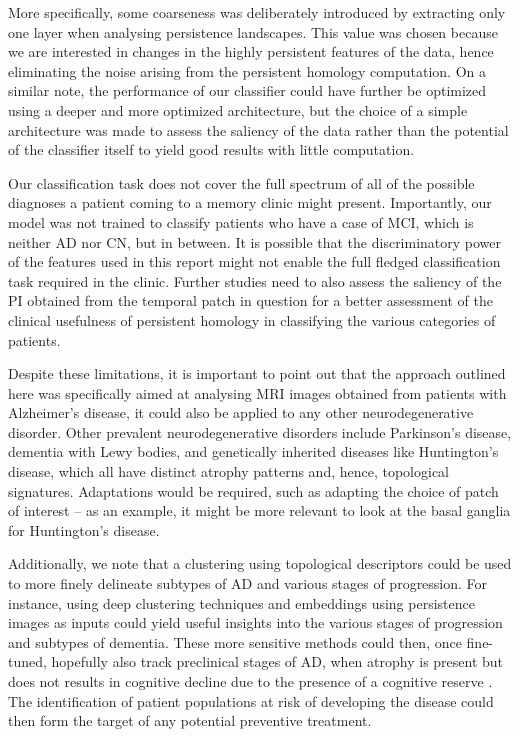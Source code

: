 \documentclass{article}
\begin{document}
More specifically, some coarseness was deliberately introduced by extracting only one layer when analysing persistence landscapes. This value was chosen because we are interested in changes in the highly persistent features of the data, hence eliminating the noise arising from the persistent homology computation. On a similar note, the performance of our classifier could have further be optimized using a deeper and more optimized architecture, but the choice of a simple architecture was made to assess the saliency of the data rather than the potential of the classifier itself to yield good results with little computation.

Our classification task does not cover the full spectrum of all of the possible diagnoses a patient coming to a memory clinic might present. Importantly, our model was not trained to classify patients who have a case of MCI, which is neither AD nor CN, but in between. It is possible that the discriminatory power of the features used in this report might not enable the full fledged classification task required in the clinic. Further studies need to also assess the saliency of the PI obtained from the temporal patch in question for a better assessment of the clinical usefulness of persistent homology in classifying the various categories of patients.

Despite these limitations, it is important to point out that the approach outlined here was specifically aimed at analysing  MRI images obtained from patients with Alzheimer's disease, it could also be applied to any other neurodegenerative disorder. Other prevalent neurodegenerative disorders include Parkinson's disease, dementia with Lewy bodies, and genetically inherited diseases like Huntington's disease, which all have distinct atrophy patterns and, hence, topological signatures. Adaptations would be required, such as adapting the choice of patch of interest -- as an example, it might be more relevant to look at the basal ganglia for Huntington's disease.

Additionally, we note that a clustering using topological descriptors could be used to more finely delineate subtypes of AD and various stages of progression. For instance, using deep clustering techniques and embeddings using persistence images as inputs could yield useful insights into the various stages of progression and subtypes of dementia. These more sensitive methods could then, once fine-tuned, hopefully also track preclinical stages of AD, when atrophy is present but does not results in cognitive decline due to the presence of a cognitive reserve \citep{scarmeas2004cognitive, van2017neuroimaging}. The identification of patient populations at risk of developing the disease could then form the target of any potential preventive treatment.
\end{document}
